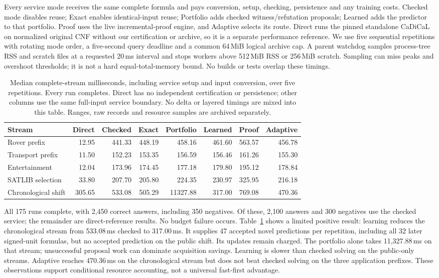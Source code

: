\documentclass[11pt,a4paper]{article}
\numberwithin{equation}{section}
\theoremstyle{plain}
\theoremstyle{definition}
\theoremstyle{remark}
\begin{document}
Every service mode receives the same complete formula and pays conversion, setup, checking, persistence and any training costs. Checked mode disables reuse; Exact enables identical-input reuse; Portfolio adds checked witness/refutation proposals; Learned adds the predictor to that portfolio. Proof uses the live incremental-proof engine, and Adaptive selects its route. Direct runs the pinned standalone CaDiCaL on normalized original CNF without our certification or archive, so it is a separate performance reference. We use five sequential repetitions with rotating mode order, a five-second query deadline and a common 64\,MiB logical archive cap. A parent watchdog samples process-tree RSS and scratch files at a requested 20\,ms interval and stops workers above 512\,MiB RSS or 256\,MiB scratch. Sampling can miss peaks and overshoot thresholds; it is not a hard equal-total-memory bound. No builds or tests overlap these timings.

\begin{table}[t]
\centering
\small
\begin{tabular}{lrrrrrrr}
\toprule
Stream & Direct & Checked & Exact & Portfolio & Learned & Proof & Adaptive \\
\midrule
Rover prefix & 12.95 & 441.33 & 448.19 & 458.16 & 461.60 & 563.57 & 456.78 \\
Transport prefix & 11.50 & 152.23 & 153.35 & 156.59 & 156.46 & 161.26 & 155.30 \\
Entertainment & 12.04 & 173.96 & 174.45 & 177.18 & 179.80 & 195.12 & 178.84 \\
SATLIB selection & 33.80 & 207.70 & 205.80 & 224.35 & 230.97 & 325.95 & 216.18 \\
Chronological shift & 305.65 & 533.08 & 505.29 & 11327.88 & 317.00 & 769.08 & 470.36 \\
\bottomrule
\end{tabular}
\caption{Median complete-stream milliseconds, including service setup and input conversion, over five repetitions. Every run completes. Direct has no independent certification or persistence; other columns use the same full-input service boundary. No delta or layered timings are mixed into this table. Ranges, raw records and resource samples are archived separately.}
\label{tab:structured}
\end{table}

All 175 runs complete, with 2,450 correct answers, including 350 negatives. Of these, 2,100 answers and 300 negatives use the checked service; the remainder are direct-reference results. No budget failure occurs. Table~\ref{tab:structured} shows a limited positive result: learning reduces the chronological stream from 533.08\,ms checked to 317.00\,ms. It supplies 47 accepted novel predictions per repetition, including all 32 later signed-unit formulas, but no accepted prediction on the public shift. Its updates remain charged. The portfolio alone takes 11,327.88\,ms on that stream; unsuccessful proposal work can dominate acquisition savings. Learning is slower than checked solving on the public-only streams. Adaptive reaches 470.36\,ms on the chronological stream but does not beat checked solving on the three application prefixes. These observations support conditional resource accounting, not a universal fast-first advantage.
\end{document}
